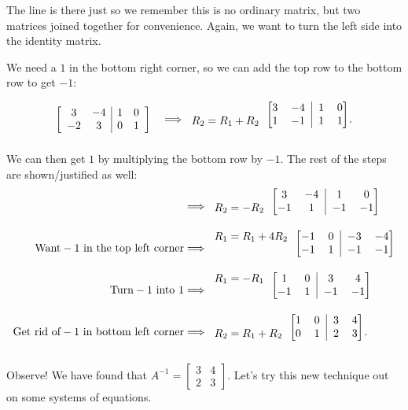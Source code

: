 \documentclass[../gatm.tex]{subfiles}
\begin{document}
\noindent The line is there just so we remember this is no ordinary matrix, but two matrices joined together for convenience. Again, we want to turn the left side into the identity matrix.

We need a $1$ in the bottom right corner, so we can add the top row to the bottom row to get $-1$:

$$\left[\begin{array}{cc|cc} 3 & -4 & 1 & 0 \\ -2 & 3 & 0 & 1 \end{array}\right]\quad\Longrightarrow
\begin{blockarray}{c[cc|cc]}
& 3 & -4 & 1 & 0 \\
R_2=R_1+R_2 & 1 & -1 & 1 & 1
\end{blockarray}.$$

\noindent We can then get $1$ by multiplying the bottom row by $-1$. The rest of the steps are shown/justified as well:
\begin{align*}
&\Longrightarrow
\begin{blockarray}{c[cc|cc]}
& 3 & -4 & 1 & 0 \\
R_2=-R_2 & -1 & 1 & -1 & -1
\end{blockarray} \\
\text{Want}-1\text{ in the top left corner} &\Longrightarrow
\begin{blockarray}{c[cc|cc]}
R_1=R_1+4R_2 & -1 & 0 & -3 & -4 \\
& -1 & 1 & -1 & -1
\end{blockarray} \\
\text{Turn}-1\text{ into }1 &\Longrightarrow
\begin{blockarray}{c[cc|cc]}
R_1=-R_1 & 1 & 0 & 3 & 4 \\
& -1 & 1 & -1 & -1
\end{blockarray} \\
\text{Get rid of}-1\text{ in bottom left corner}&\Longrightarrow
\begin{blockarray}{c[cc|cc]}
& 1 & 0 & 3 & 4 \\
R_2=R_1+R_2 & 0 & 1 & 2 & 3
\end{blockarray}. \\
\end{align*}

\noindent Observe! We have found that $A^{-1}=\left[\begin{array}{cc}3 & 4 \\ 2 & 3\end{array}\right]$. Let's try this new technique out on some systems of equations.
\end{document}
